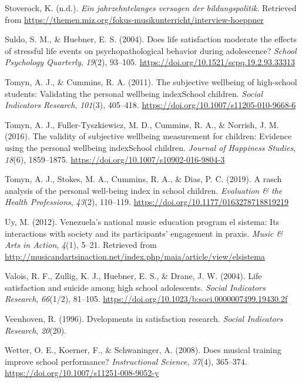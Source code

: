 \documentclass[a4, 12pt]{article}
\begin{document}
\leavevmode\hypertarget{ref-Stoverock}{}%
Stoverock, K. (n.d.). \emph{Ein jahrzehntelanges versagen der bildungspolitik}. Retrieved from \url{https://themen.miz.org/fokus-musikunterricht/interview-hoeppner}

\leavevmode\hypertarget{ref-Suldo2004}{}%
Suldo, S. M., \& Huebner, E. S. (2004). Does life satisfaction moderate the effects of stressful life events on psychopathological behavior during adolescence? \emph{School Psychology Quarterly}, \emph{19}(2), 93--105. \url{https://doi.org/10.1521/scpq.19.2.93.33313}

\leavevmode\hypertarget{ref-Tomyn2011a}{}%
Tomyn, A. J., \& Cummins, R. A. (2011). The subjective wellbeing of high-school students: Validating the personal wellbeing indexSchool children. \emph{Social Indicators Research}, \emph{101}(3), 405--418. \url{https://doi.org/10.1007/s11205-010-9668-6}

\leavevmode\hypertarget{ref-Tomyn2016}{}%
Tomyn, A. J., Fuller-Tyszkiewicz, M. D., Cummins, R. A., \& Norrish, J. M. (2016). The validity of subjective wellbeing measurement for children: Evidence using the personal wellbeing indexSchool children. \emph{Journal of Happiness Studies}, \emph{18}(6), 1859--1875. \url{https://doi.org/10.1007/s10902-016-9804-3}

\leavevmode\hypertarget{ref-Tomyn2019}{}%
Tomyn, A. J., Stokes, M. A., Cummins, R. A., \& Dias, P. C. (2019). A rasch analysis of the personal well-being index in school children. \emph{Evaluation \& the Health Professions}, \emph{43}(2), 110--119. \url{https://doi.org/10.1177/0163278718819219}

\leavevmode\hypertarget{ref-Uy2012}{}%
Uy, M. (2012). Venezuela's national music education program el sistema: Its interactions with society and its participants' engagement in praxis. \emph{Music \& Arts in Action}, \emph{4}(1), 5--21. Retrieved from \url{http://musicandartsinaction.net/index.php/maia/article/view/elsistema}

\leavevmode\hypertarget{ref-Valois2004}{}%
Valois, R. F., Zullig, K. J., Huebner, E. S., \& Drane, J. W. (2004). Life satisfaction and suicide among high school adolescents. \emph{Social Indicators Research}, \emph{66}(1/2), 81--105. \url{https://doi.org/10.1023/b:soci.0000007499.19430.2f}

\leavevmode\hypertarget{ref-Veenhoven1996}{}%
Veenhoven, R. (1996). Dvelopments in satisfaction research. \emph{Social Indicators Research}, \emph{20}(20).

\leavevmode\hypertarget{ref-Wetter2008}{}%
Wetter, O. E., Koerner, F., \& Schwaninger, A. (2008). Does musical training improve school performance? \emph{Instructional Science}, \emph{37}(4), 365--374. \url{https://doi.org/10.1007/s11251-008-9052-y}
\end{document}
